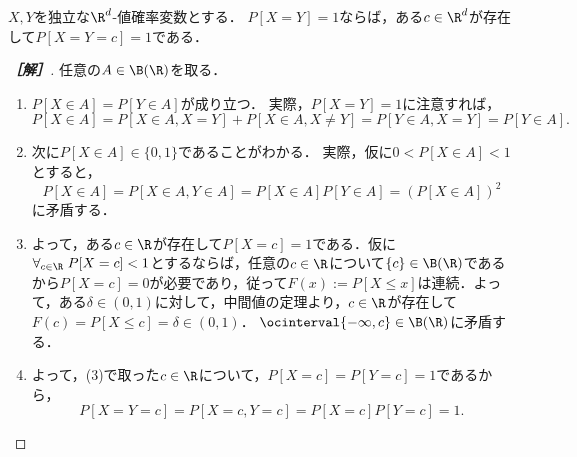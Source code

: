 \documentclass[uplatex,dvipdfmx]{jsarticle}
\begin{document}
\begin{problem*}[13]
    $X,Y$を独立な$\R^d$-値確率変数とする．
    $P[X=Y]=1$ならば，ある$c\in\R^d$が存在して$P[X=Y=c]=1$である．
\end{problem*}
\begin{proof}[\bf［解］]
    任意の$A\in\B(\R)$を取る．
    \begin{enumerate}
        \item $P[X\in A]=P[Y\in A]$が成り立つ．
        実際，$P[X=Y]=1$に注意すれば，
        \[P[X\in A]=P[X\in A,X=Y]+P[X\in A,X\ne Y]=P[Y\in A,X=Y]=P[Y\in A].\]
        \item 次に$P[X\in A]\in\{0,1\}$であることがわかる．
        実際，仮に$0<P[X\in A]<1$とすると，
        \[P[X\in A]=P[X\in A,Y\in A]=P[X\in A]P[Y\in A]=(P[X\in A])^2\]
        に矛盾する．
        \item よって，ある$c\in\R$が存在して$P[X=c]=1$である．仮に$\forall_{c\in\R}\;P[X=c]<1$とするならば，任意の$c\in\R$について$\{c\}\in\B(\R)$であるから$P[X=c]=0$が必要であり，従って$F(x):=P[X\le x]$は連続．よって，ある$\delta\in(0,1)$に対して，中間値の定理より，$c\in\R$が存在して$F(c)=P[X\le c]=\delta\in(0,1)$．
        $\ocinterval{-\infty,c}\in\B(\R)$に矛盾する．
        \item よって，(3)で取った$c\in\R$について，$P[X=c]=P[Y=c]=1$であるから，
        \[P[X=Y=c]=P[X=c,Y=c]=P[X=c]P[Y=c]=1.\]
    \end{enumerate}
\end{proof}
\end{document}
